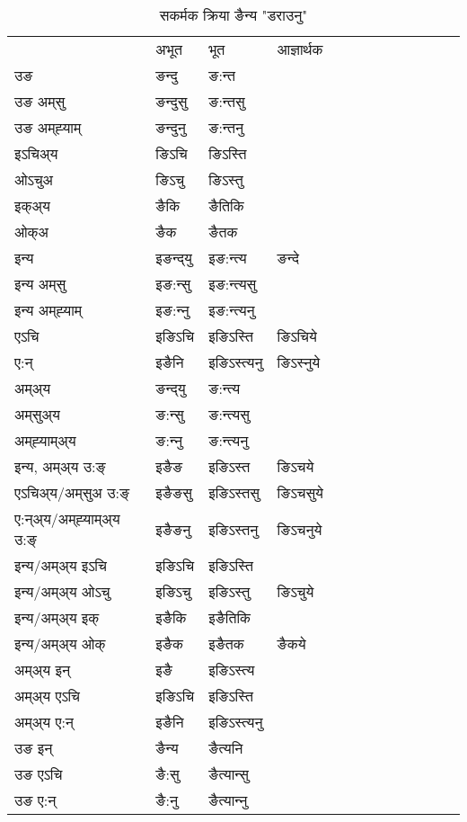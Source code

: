 \begin{table}[H]
\centering
\caption{\label{int.vt} सकर्मक क्रिया  ङैन्य  "डराउनु"  }
\begin{tabular}{l|l|l|l|l|l|l|l|l|l|l|l|l}  \toprule
&अभूत & भूत & आज्ञार्थक \\ 
उङ &ङन्दु &ङ:न्त \\ 
उङ अम्‌सु&ङन्दुसु &ङ:न्तसु \\ 
उङ अम्‌ह्‍याम्&ङन्दुनु &ङ:न्तनु \\ 
इऽचिअ्य &ङिऽचि &ङिऽस्ति   \\ 
ओऽचुअ        &ङिऽचु &ङिऽस्तु   \\ 
इक्अ्य&ङैकि &ङैतिकि   \\ 
ओक्अ &ङैक &ङैतक   \\ 
इन्य & इङन्द्‌यु  & इङ:न्त्य &ङन्दे  \\ 
इन्य अम्‌सु& इङ:न्सु  & इङ:न्त्यसु   \\ 
इन्य अम्‌ह्‍याम्& इङ:न्‍नु  & इङ:न्त्यनु   \\ 
एऽचि & इङिऽचि & इङिऽस्ति &ङिऽचिये    \\ 
ए:न् & इङैनि  & इङिऽस्त्यनु &ङिऽस्‍नुये  \\ 
अम्अ्य & ङन्द्‌यु  & ङ:न्त्य  \\ 
अम्‌सुअ्य & ङ:न्सु & ङ:न्त्यसु  \\ 
अम्‌ह्‍याम्अ्य & ङ:न्‍नु  & ङ:न्त्यनु \\ 
\midrule
इन्य, अम्अ्य उ:ङ्‌ &इङैङ &इङिऽस्त &ङिऽचये \\ 
एऽचिअ्य/अम्‌सुअ उ:ङ्‌ &इङैङसु &इङिऽस्तसु &ङिऽचसुये \\ 
ए:न्अ्य/अम्‌ह्‍याम्अ्य उ:ङ्‌ &इङैङनु &इङिऽस्तनु &ङिऽचनुये \\ 
इन्य/अम्अ्य इऽचि &इङिऽचि &इङिऽस्ति    \\ 
इन्य/अम्अ्य ओऽचु &इङिऽचु &इङिऽस्तु  &ङिऽचुये  \\ 
इन्य/अम्अ्य इक् &इङैकि &इङैतिकि   \\ 
इन्य/अम्अ्य ओक् &इङैक &इङैतक  &ङैकये  \\ 
अम्अ्य इन् & इङै & इङिऽस्त्य   \\ 
अम्अ्य एऽचि & इङिऽचि & इङिऽस्ति    \\ 
अम्अ्य ए:न् & इङैनि  & इङिऽस्त्यनु  \\ 
\midrule
उङ इन् & ङैन्य  & ङैत्यनि  \\ 
उङ एऽचि & ङै:सु  & ङैत्यान्सु   \\ 
उङ ए:न्& ङै:नु  & ङैत्यान्‍नु   \\ 
\bottomrule
\end{tabular}
\end{table}


